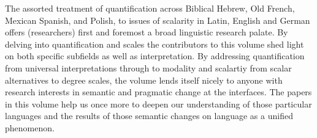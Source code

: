 \documentclass[output=paper]{langsci/langscibook}
\begin{document}
The assorted treatment of quantification across Biblical Hebrew, Old French, Mexican Spanish, and Polish, to issues of scalarity in Latin, English and German offers (researchers) first and foremost a broad linguistic research palate. By delving into quantification and scales the contributors to this volume shed light on both specific subfields as well as interpretation.  By addressing quantification from universal interpretations through to modality and scalartiy from scalar alternatives to degree scales, the volume lends itself nicely to anyone with research interests in semantic and pragmatic change at the interfaces. The papers in this volume help us once more to deepen our understanding of those particular languages and the results of those semantic changes on language as a unified phenomenon. 

{\sloppy\printbibliography[heading=subbibliography,notkeyword=this]}
\end{document}
